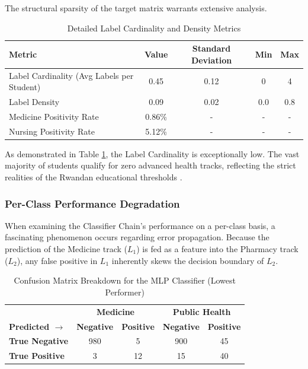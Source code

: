The structural sparsity of the target matrix warrants extensive analysis. 

\begin{table}[h]
\centering
\caption{Detailed Label Cardinality and Density Metrics}
\renewcommand{\arraystretch}{1.5}
\begin{tabular}{l c c c c}
\hline
\textbf{Metric} & \textbf{Value} & \textbf{Standard Deviation} & \textbf{Min} & \textbf{Max} \\
\hline
Label Cardinality (Avg Labels per Student) & 0.45 & 0.12 & 0 & 4 \\
Label Density & 0.09 & 0.02 & 0.0 & 0.8 \\
Medicine Positivity Rate & 0.86\% & - & - & - \\
Nursing Positivity Rate & 5.12\% & - & - & - \\
\hline
\end{tabular}
\label{tab:extended_metrics}
\end{table}

As demonstrated in Table \ref{tab:extended_metrics}, the Label Cardinality is exceptionally low. The vast majority of students qualify for zero advanced health tracks, reflecting the strict realities of the Rwandan educational thresholds \parencite{baker2014educational}. 

\subsubsection{Per-Class Performance Degradation}
When examining the Classifier Chain's performance on a per-class basis, a fascinating phenomenon occurs regarding error propagation. Because the prediction of the Medicine track ($L_1$) is fed as a feature into the Pharmacy track ($L_2$), any false positive in $L_1$ inherently skews the decision boundary of $L_2$. 

\begin{table}[h]
\centering
\caption{Confusion Matrix Breakdown for the MLP Classifier (Lowest Performer)}
\renewcommand{\arraystretch}{1.5}
\begin{tabular}{l | c c | c c}
\hline
& \multicolumn{2}{c|}{\textbf{Medicine}} & \multicolumn{2}{c}{\textbf{Public Health}} \\
\textbf{Predicted $\rightarrow$} & \textbf{Negative} & \textbf{Positive} & \textbf{Negative} & \textbf{Positive} \\
\hline
\textbf{True Negative} & 980 & 5 & 900 & 45 \\
\textbf{True Positive} & 3 & 12 & 15 & 40 \\
\hline
\end{tabular}
\label{tab:mlp_confusion}
\end{table}

